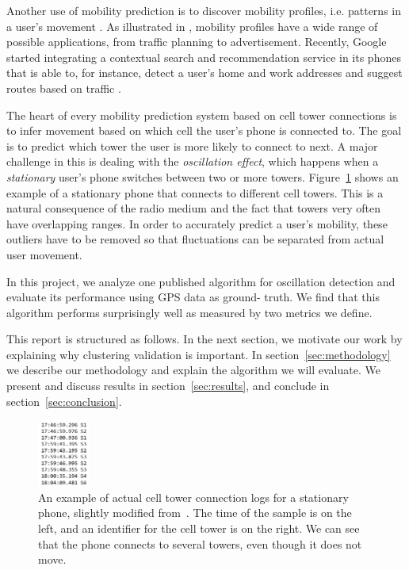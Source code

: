 \documentclass[letterpaper, 12pt, conference]{ieeeconf}
\begin{document}
Another use of mobility prediction is to discover mobility profiles, i.e. 
patterns in a user's movement \cite{mobilityprofiler}. As illustrated in \cite
{mobilityprofiler}, mobility profiles have a wide range of possible 
applications, from traffic planning to advertisement. Recently, Google 
started integrating
a contextual search and recommendation service in its phones that is able to, 
for instance, detect a user's home and work addresses and suggest routes 
based on
traffic \cite{googleNow}.


The heart of every mobility prediction system based on cell tower connections 
is to infer movement based on which cell the user's phone is connected to. 
The goal
is to predict which tower the user is more likely to connect to next. A major 
challenge in this is dealing with the \textit{oscillation effect}, which 
happens when a \textit{stationary} user's phone switches between two or more 
towers. Figure~\ref{fig:stationary} shows an example of a stationary phone 
that connects to different cell towers. This is a natural consequence of the 
radio medium and the fact that towers very often have overlapping ranges. In 
order to accurately predict a user's mobility, these outliers have to be 
removed so that fluctuations can be separated from actual user movement.

In this project, we analyze one published algorithm for oscillation detection 
\cite{mobilityprofiler} and evaluate its performance using GPS data as ground-
truth. We find that this algorithm performs surprisingly well as measured by 
two metrics we define.

This report is structured as follows. In the next section, we motivate our 
work by explaining why clustering validation is important.
In section~\ref{sec:methodology} we describe our methodology  and explain the algorithm we 
will evaluate. We present and discuss results in section~\ref{sec:results}, 
and conclude in section~\ref{sec:conclusion}.

\begin{figure}
\centering
\includegraphics[width=0.15\textwidth]{figs/stationary_oscillation}
\caption{An example of actual cell tower connection logs for a stationary 
phone, slightly modified from~\cite{LeapGraph}. The time of the sample is on 
the left, and an identifier for the cell tower is on the right. We can see 
that the phone connects to several towers, even though it does not move. }
\label{fig:stationary}
\end{figure}
\end{document}
